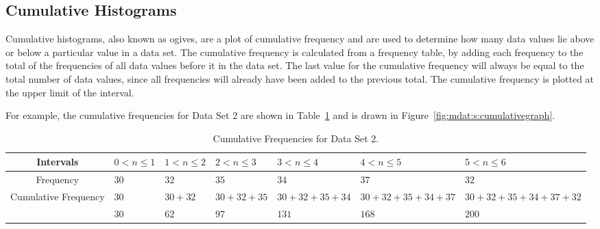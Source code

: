 \subsection{Cumulative Histograms}
Cumulative histograms, also known as ogives, are a plot of cumulative frequency and are used to determine how many data values lie above or below a particular value in a data set. The cumulative frequency is calculated from a frequency table, by adding each frequency to the total of the frequencies of all data values before it in the data set. The last value for the cumulative frequency will always be equal to the total number of data values, since all frequencies will already have been added to the previous total. The cumulative frequency is plotted at the upper limit of the interval.

For example, the cumulative frequencies for Data Set 2 are shown in Table~\ref{tab:mdat:s:cumulativeds2} and is drawn in Figure~\ref{fig:mdat:s:cumulativegraph}.

\begin{table}[htb]
\begin{center}
\begin{tabular}{|c||p{1cm}|p{1cm}|p{1cm}|p{1cm}|p{1cm}|p{1cm}|}\hline
Intervals & $0<n\leq 1 $ & $1<n\leq 2 $ & $2<n\leq 3 $ & $3<n\leq 4 $ & $4<n\leq 5$ & $5<n\leq 6 $ \\ 
\hline
Frequency & $30$ &$32$ &$35$ &$34$ &$37$ &$32$\\
\hline
Cumulative Frequency & $30$ &$30 + 32$ &$30 + 32 + 35$ &$30 + 32 + 35 + 34$ &$30 + 32 + 35 + 34 + 37 $&$30 + 32 + 35 + 34 + 37 + 32$\\
\hline
& $30$ &$ 62$ & $97$ & $131$ & $168$ & $200$\\
\hline
\end{tabular}
\caption{Cumulative Frequencies for Data Set 2. \label{tab:mdat:s:cumulativeds2}}
\end{center}
\end{table}

